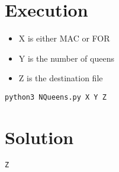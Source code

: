 \documentclass[11pt]{article}
\author{DESKTOP-OEFS7VE}
\date{\today}
\title{}
\begin{document}
\tableofcontents

\section{Execution}
\label{sec:orgfb82a73}
\begin{itemize}
\item X is either MAC or FOR
\item Y is the number of queens
\item Z is the destination file
\end{itemize}
\lstset{language=shell,label= ,caption= ,captionpos=b,numbers=none}
\begin{lstlisting}
python3 NQueens.py X Y Z
\end{lstlisting}
\section{Solution}
\label{sec:org19ee606}
\lstset{language=shell,label= ,caption= ,captionpos=b,numbers=none}
\begin{lstlisting}
Z
\end{lstlisting}
\end{document}
